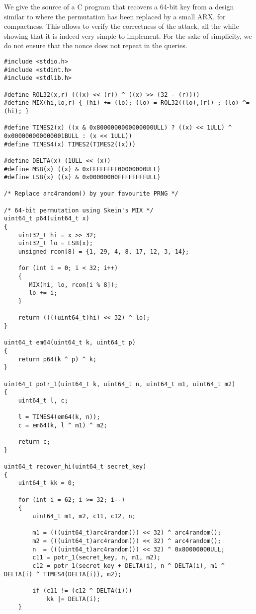 We give the source of a C program that recovers a 64-bit key from a design similar to \proestotr where
the permutation has been replaced by a small ARX, for compactness. This allows to verify the correctness
of the attack, all the while showing that it is indeed very simple to implement. For the sake of simplicity,
we do not ensure that the nonce does not repeat in the queries.

\begin{verbatim}
#include <stdio.h>
#include <stdint.h>
#include <stdlib.h>

#define ROL32(x,r) (((x) << (r)) ^ ((x) >> (32 - (r))))
#define MIX(hi,lo,r) { (hi) += (lo); (lo) = ROL32((lo),(r)) ; (lo) ^= (hi); }

#define TIMES2(x) ((x & 0x8000000000000000ULL) ? ((x) << 1ULL) ^  0x000000000000001BULL : (x << 1ULL))
#define TIMES4(x) TIMES2(TIMES2((x)))

#define DELTA(x) (1ULL << (x))
#define MSB(x) ((x) & 0xFFFFFFFF00000000ULL)
#define LSB(x) ((x) & 0x00000000FFFFFFFFULL)

/* Replace arc4random() by your favourite PRNG */

/* 64-bit permutation using Skein's MIX */
uint64_t p64(uint64_t x)
{
	uint32_t hi = x >> 32;
	uint32_t lo = LSB(x);
	unsigned rcon[8] = {1, 29, 4, 8, 17, 12, 3, 14};

	for (int i = 0; i < 32; i++)
	{
	   MIX(hi, lo, rcon[i % 8]);
	   lo += i;
	}

	return ((((uint64_t)hi) << 32) ^ lo);
}

uint64_t em64(uint64_t k, uint64_t p)
{
	return p64(k ^ p) ^ k;
}

uint64_t potr_1(uint64_t k, uint64_t n, uint64_t m1, uint64_t m2)
{
	uint64_t l, c;

	l = TIMES4(em64(k, n));
	c = em64(k, l ^ m1) ^ m2;

	return c;
}

uint64_t recover_hi(uint64_t secret_key)
{
	uint64_t kk = 0;

	for (int i = 62; i >= 32; i--)
	{
		uint64_t m1, m2, c11, c12, n;

		m1 = (((uint64_t)arc4random()) << 32) ^ arc4random();
		m2 = (((uint64_t)arc4random()) << 32) ^ arc4random();
		n  = (((uint64_t)arc4random()) << 32) ^ 0x80000000ULL;
		c11 = potr_1(secret_key, n, m1, m2);
		c12 = potr_1(secret_key + DELTA(i), n ^ DELTA(i), m1 ^ DELTA(i) ^ TIMES4(DELTA(i)), m2);

		if (c11 != (c12 ^ DELTA(i)))
			kk |= DELTA(i);
	}


\end{verbatim}
